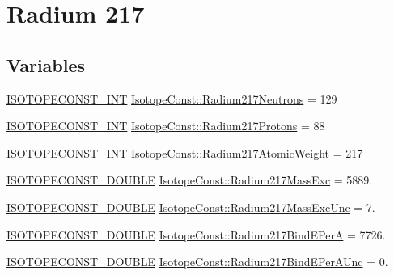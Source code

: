 \hypertarget{group___isotope_const-_radium-_ra217}{}\section{Radium 217}
\label{group___isotope_const-_radium-_ra217}
\subsection*{Variables}
\begin{DoxyCompactItemize}
\item 
\mbox{\hyperlink{group___isotope_const-_macros_ga5f18360b3e99483a35c32d789e62621c}{I\+S\+O\+T\+O\+P\+E\+C\+O\+N\+S\+T\+\_\+\+I\+NT}} \mbox{\hyperlink{group___isotope_const-_radium-_ra217_ga2ca2b206f0264935ad996e8ffa860881}{Isotope\+Const\+::\+Radium217\+Neutrons}} = 129
\item 
\mbox{\hyperlink{group___isotope_const-_macros_ga5f18360b3e99483a35c32d789e62621c}{I\+S\+O\+T\+O\+P\+E\+C\+O\+N\+S\+T\+\_\+\+I\+NT}} \mbox{\hyperlink{group___isotope_const-_radium-_ra217_gae8fcdace15578f8651c018366b4a1bf6}{Isotope\+Const\+::\+Radium217\+Protons}} = 88
\item 
\mbox{\hyperlink{group___isotope_const-_macros_ga5f18360b3e99483a35c32d789e62621c}{I\+S\+O\+T\+O\+P\+E\+C\+O\+N\+S\+T\+\_\+\+I\+NT}} \mbox{\hyperlink{group___isotope_const-_radium-_ra217_ga1380490fd5b628c757795d0811f3ea97}{Isotope\+Const\+::\+Radium217\+Atomic\+Weight}} = 217
\item 
\mbox{\hyperlink{group___isotope_const-_macros_ga8f45a7272ce02c0b4c65c44636ed719a}{I\+S\+O\+T\+O\+P\+E\+C\+O\+N\+S\+T\+\_\+\+D\+O\+U\+B\+LE}} \mbox{\hyperlink{group___isotope_const-_radium-_ra217_ga8b1c77ea4319be4b36ef5f9e537c050d}{Isotope\+Const\+::\+Radium217\+Mass\+Exc}} = 5889.
\item 
\mbox{\hyperlink{group___isotope_const-_macros_ga8f45a7272ce02c0b4c65c44636ed719a}{I\+S\+O\+T\+O\+P\+E\+C\+O\+N\+S\+T\+\_\+\+D\+O\+U\+B\+LE}} \mbox{\hyperlink{group___isotope_const-_radium-_ra217_ga51da3f7743e7ec97f99a608468c21ad0}{Isotope\+Const\+::\+Radium217\+Mass\+Exc\+Unc}} = 7.
\item 
\mbox{\hyperlink{group___isotope_const-_macros_ga8f45a7272ce02c0b4c65c44636ed719a}{I\+S\+O\+T\+O\+P\+E\+C\+O\+N\+S\+T\+\_\+\+D\+O\+U\+B\+LE}} \mbox{\hyperlink{group___isotope_const-_radium-_ra217_ga5d0933bd197cacff4f95e8884d85afed}{Isotope\+Const\+::\+Radium217\+Bind\+E\+PerA}} = 7726.
\item 
\mbox{\hyperlink{group___isotope_const-_macros_ga8f45a7272ce02c0b4c65c44636ed719a}{I\+S\+O\+T\+O\+P\+E\+C\+O\+N\+S\+T\+\_\+\+D\+O\+U\+B\+LE}} \mbox{\hyperlink{group___isotope_const-_radium-_ra217_gaa24e3b3a67a688608203af239eab61b8}{Isotope\+Const\+::\+Radium217\+Bind\+E\+Per\+A\+Unc}} = 0.

\end{DoxyCompactItemize}

